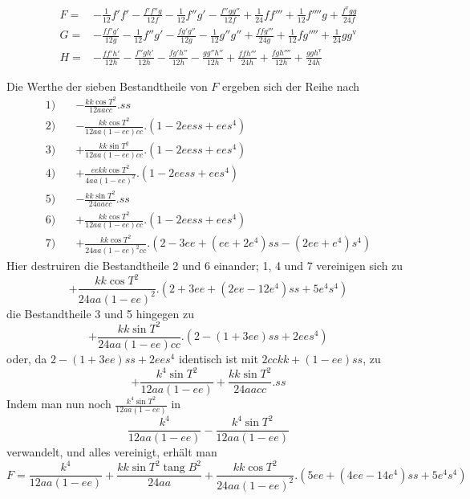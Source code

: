 %
\[
\begin{aligned}
F={}&-\tfrac1{12}f'f'-\frac{f'f''g}{12f}-\tfrac1{12}f''g'-\frac{f''gg''}{12f}+\tfrac1{24}ff'''+\tfrac1{12}f''''g+\frac{f^{\mathrm{v}}gg}{24f}\\
G={}&-\frac{ff'g'}{12g}-\tfrac1{12}f''g'-\frac{fg'g''}{12g}-\tfrac1{12}g''g''+\frac{ffg'''}{24g}+\tfrac1{12}fg''''+\tfrac1{24}gg^{\mathrm{v}}\\
H={}&-\frac{ff'h'}{12h}-\frac{f''gh'}{12h}-\frac{fg'h''}{12h}-\frac{gg''h''}{12h}+\frac{ffh'''}{24h}+\frac{fgh''''}{12h}+\frac{ggh^{\mathrm{v}}}{24h}
\end{aligned}
\]

Die Werthe der sieben Bestandtheile von \(F\) ergeben sich der Reihe nach
\[
\begin{aligned}
1)\quad&-\frac{kk\cos T^2}{12aacc}\mathord{.}ss\\
2)\quad&-\frac{kk\cos T^2}{12aa(1-ee)cc}\mathord{.}(1-2eess+ees^4)\\
3)\quad&+\frac{kk\sin T^2}{12aa(1-ee)cc}\mathord{.}(1-2eess+ees^4)\\
4)\quad&+\frac{eekk\cos T^2}{4aa(1-ee)^2}\mathord{.}(1-2eess+ees^4)\\
5)\quad&-\frac{kk\sin T^2}{24aacc}\mathord{.}ss\\
6)\quad&+\frac{kk\cos T^2}{12aa(1-ee)cc}\mathord{.}(1-2eess+ees^4)\\
7)\quad&+\frac{kk\cos T^2}{24aa(1-ee)^2cc}\mathord{.}(2-3ee+(ee+2e^4)ss-(2ee+e^4)s^4)
\end{aligned}
\]
Hier destruiren die Bestandtheile 2 und 6 einander; 1, 4 und 7 vereinigen sich zu
\[
+\frac{kk\cos T^2}{24aa(1-ee)^2}\mathord{.}(2+3ee+(2ee-12e^4)ss+5e^4s^4)
\]
die Bestandtheile 3 und 5 hingegen zu
\[
+\frac{kk\sin T^2}{24aa(1-ee)cc}\mathord{.}(2-(1+3ee)ss+2ees^4)
\]
oder, da \(2-(1+3ee)ss+2ees^4\) identisch ist mit \(2cckk+(1-ee)ss\), zu
\[
+\frac{k^4\sin T^2}{12aa(1-ee)}+\frac{kk\sin T^2}{24aacc}\mathord{.}ss
\]
Indem man nun noch \(\frac{k^4\sin T^2}{12aa(1-ee)}\) in
\[
\frac{k^4}{12aa(1-ee)}-\frac{k^4\sin T^2}{12aa(1-ee)}
\]
verwandelt, und alles vereinigt, erhält man
\begingroup\fontsize{10}{12}\selectfont
\[
F=\frac{k^4}{12aa(1-ee)}+\frac{kk\sin T^2\operatorname{tang}B^2}{24aa}+\frac{kk\cos T^2}{24aa(1-ee)^2}\mathord{.}(5ee+(4ee-14e^4)ss+5e^4s^4)
\]
\endgroup
